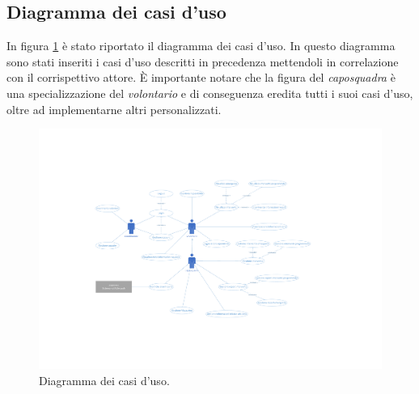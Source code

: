 \clearpage
\subsection{Diagramma dei casi d'uso}
In figura \ref{fig:UseCaseDiagram} è stato riportato il diagramma dei casi d'uso. In questo diagramma sono stati inseriti i casi d'uso descritti in precedenza mettendoli in correlazione con il corrispettivo attore. È importante notare che la figura del \textit{caposquadra} è una specializzazione del \textit{volontario} e di conseguenza eredita tutti i suoi casi d'uso, oltre ad implementarne altri personalizzati. 

\begin{figure}
	\centering
	\includegraphics[width=0.9\linewidth]{OtherFiles/Use cases diagram}
	\caption{Diagramma dei casi d'uso.}
	\label{fig:UseCaseDiagram}
\end{figure}


